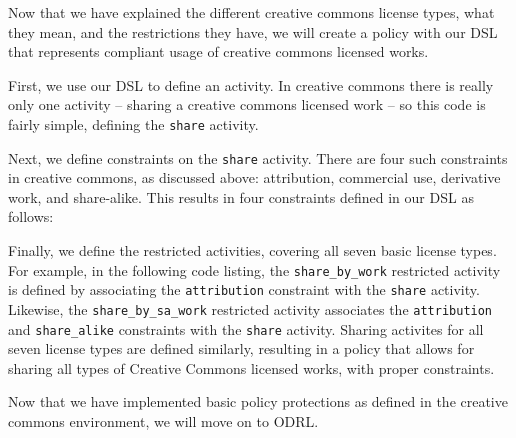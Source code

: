 Now that we have explained the different creative commons license types, what
they mean, and the restrictions they have, we will create a policy with our DSL
that represents compliant usage of creative commons licensed works.

First, we use our DSL to define an activity.  In creative commons there is
really only one activity --  sharing a creative commons licensed work -- so
this code is fairly simple, defining the \texttt{share} activity.



Next, we define constraints on the \texttt{share} activity.  There are four
such constraints in creative commons, as discussed above: attribution,
commercial use, derivative work, and share-alike.  This results in four
constraints defined in our DSL as follows:



Finally, we define the restricted activities, covering all seven basic license
types.  For example, in the following code listing, the
\texttt{share\_by\_work} restricted activity is defined by associating the
\texttt{attribution} constraint with the \texttt{share} activity. Likewise, the
\texttt{share\_by\_sa\_work} restricted activity associates the
\texttt{attribution} and \texttt{share\_alike} constraints with the
\texttt{share} activity.  Sharing activites for all seven license types are defined
similarly, resulting in a policy that allows for sharing all types of Creative
Commons licensed works, with proper constraints.



Now that we have implemented basic policy protections as defined in the creative commons environment, we will move on to ODRL.
